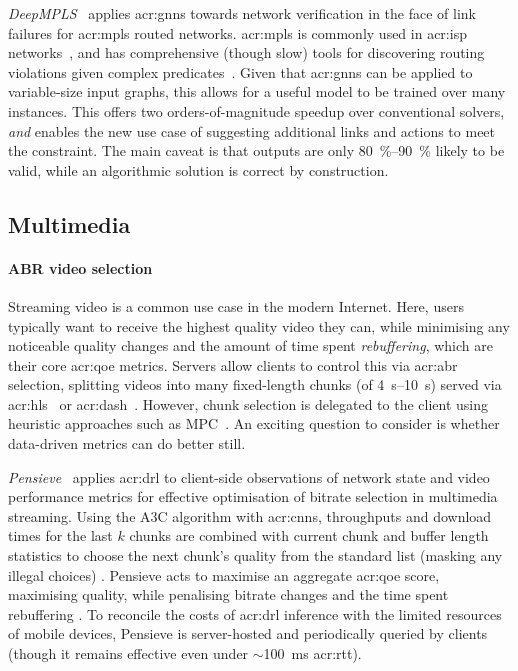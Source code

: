 \emph{DeepMPLS}~\parencite{DBLP:conf/networking/Geyer019} applies \glspl{acr:gnn} towards network verification in the face of link failures for \gls{acr:mpls} routed networks.
\gls{acr:mpls} is commonly used in \gls{acr:isp} networks~\parencite{DBLP:conf/imc/VanaubelMPD15}, and has comprehensive (though slow) tools for discovering routing violations given complex predicates~\parencite{DBLP:conf/conext/JensenKM0ST18}.
Given that \glspl{acr:gnn} can be applied to variable-size input graphs, this allows for a useful model to be trained over many instances.
This offers two orders-of-magnitude speedup over conventional solvers, \emph{and} enables the new use case of suggesting additional links and actions to meet the constraint.
The main caveat is that outputs are only \qtyrange{80}{90}{\percent} likely to be valid, while an algorithmic solution is correct by construction.

\subsection{Multimedia}

\paragraph{ABR video selection}
Streaming video is a common use case in the modern Internet.
Here, users typically want to receive the highest quality video they can, while minimising any noticeable quality changes and the amount of time spent \emph{rebuffering}, which are their core \gls{acr:qoe} metrics.
Servers allow clients to control this via \gls{acr:abr} selection, splitting videos into many fixed-length chunks (of \qtyrange{4}{10}{\second}) served via \gls{acr:hls}~\parencite{rfc8216} or \gls{acr:dash}~\parencite{mpeg-dash}.
However, chunk selection is delegated to the client using heuristic approaches such as MPC~\parencite{DBLP:conf/sigcomm/YinJSS15}. 
An exciting question to consider is whether data-driven metrics can do better still.

\emph{Pensieve}~\parencite{DBLP:conf/sigcomm/MaoNA17} applies \gls{acr:drl} to client-side observations of network state and video performance metrics for effective optimisation of bitrate selection in multimedia streaming.
Using the A3C algorithm with \glspl{acr:cnn}, throughputs and download times for the last $k$ chunks are combined with current chunk and buffer length statistics \prllitstate{} to choose the next chunk's quality from the standard list (masking any illegal choices) \prllitact{}.
Pensieve acts to maximise an aggregate \gls{acr:qoe} score, maximising quality, while penalising bitrate changes and the time spent rebuffering \prllitreward{}.
To reconcile the costs of \gls{acr:drl} inference with the limited resources of mobile devices, Pensieve is server-hosted and periodically queried by clients (though it remains effective even under $\sim$\qty{100}{\milli\second} \gls{acr:rtt}).

